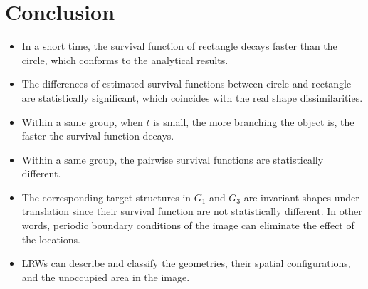 
    \section{Conclusion}

      \begin{itemize}
         \item In a short time, the survival function of rectangle decays faster than the circle, which conforms to the analytical results.
  
         \item The differences of estimated survival functions between circle and rectangle are statistically significant, which coincides with the real shape dissimilarities.

         \item Within a same group, when $t$ is small, the more branching the object is, the faster the survival function decays.

         \item Within a same group, the pairwise survival functions are statistically different.

         \item The corresponding target structures in $G_1$ and $G_3$ are invariant shapes under translation since their survival function are not statistically different. In other words, periodic boundary conditions of the image can eliminate the effect of the locations.

         \item LRWs can describe and classify the geometries, their spatial configurations, and the unoccupied area in the image.
    \end{itemize}

